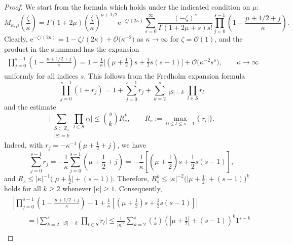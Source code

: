\documentclass[pdftex]{sigma}
\numberwithin{equation}{section}
\newcommand{\ee}{\mathrm{e}}
\begin{document}
\begin{proof}
We start from the formula \cite[equation~(13.14.6)]{DLMF} which holds under the indicated condition on $\mu$:
\begin{equation*}
 M_{\kappa,\mu}\left(\frac{\zeta}{\kappa}\right)=
 \Gamma(1+2\mu)\left(\frac{\zeta}{\kappa}\right)^{\mu+1/2}\ee^{-\zeta/(2\kappa)}\sum_{s=0}^\infty\frac{(-\zeta)^s}{\Gamma(1+2\mu+s)s!}\prod_{j=0}^{s-1}\left(1-\frac{\mu+1/2+j}{\kappa}\right).
\end{equation*}
Clearly, $\ee^{-\zeta/(2\kappa)}=1-\zeta/(2\kappa)+\mathcal{O}\big(\kappa^{-2}\big)$ as $\kappa\to\infty$ for $\zeta=\mathcal{O}(1)$, and the product in the summand has the expansion
\begin{gather}
 \prod_{j=0}^{s-1}\left(1-\frac{\mu+1/2+j}{\kappa}\right) = 1 -\frac{1}{\kappa}\bigg[\left(\mu+\frac{1}{2}\right)s +\frac{1}{2}s(s-1)\bigg] + \mathcal{O}\big(\kappa^{-2}s^s\big),\qquad\kappa\to\infty\!\!\!
\label{eq:uniform-estimate}
\end{gather}
uniformly for all indices $s$.
This follows from the Fredholm expansion formula
\begin{equation*}
 \prod_{j=0}^{s-1}(1+r_j) = 1+\sum_{j=0}^{s-1}r_j + \sum_{k=2}^{s}
 \mathop{\sum_{S\subset \mathbb{Z}_s}}_{|S|=k}\prod_{l\in S}r_l
\end{equation*}
and the estimate
\begin{equation*}
 \Biggl| \sum_{\substack{S\subset \mathbb{Z}_s \\ |S|=k}}\prod_{l\in S}r_l\Biggr|\le \binom{s}{k}R_s^k,\qquad R_s:=\max_{0\le l\le s-1}\{|r_l|\}.
\end{equation*}
Indeed, with $r_j=-\kappa^{-1}(\mu+\frac{1}{2}+j)$, we have
\begin{equation*}
 \sum_{j=0}^{s-1}r_j=-\frac{1}{\kappa}\sum_{j=0}^{s-1}\left(\mu+\frac{1}{2}+j\right) = -\frac{1}{\kappa}\left[\left(\mu+\frac{1}{2}\right)s + \frac{1}{2}s(s-1)\right],
\end{equation*}
and $R_s\le |\kappa|^{-1}\big(\big|\mu+\frac{1}{2}\big| + (s-1)\big)$. Therefore, $R_s^k\le |\kappa|^{-2}\big(\big|\mu+\frac{1}{2}\big|+(s-1)\big)^k$ holds for all $k\ge 2$ whenever $|\kappa|\ge 1$. Consequently,
\begin{gather*}
 \left|\prod_{j=0}^{s-1}\left(1-\frac{\mu+1/2+j}{\kappa}\right)-1+\right. \left.\frac{1}{\kappa}\left[\left(\mu+\frac{1}{2}\right)s+ \frac{1}{2}s(s-1)\right]\right|\\
 \qquad=\Biggl|\sum_{k=2}^s\mathop{\sum_{S\subset\mathbb{Z}_s}}_{|S|=k}\prod_{l\in S}r_l\Biggr|\le \frac{1}{|\kappa|^2}\sum_{k=2}^s\binom{s}{k}\left(\left|\mu+\frac{1}{2}\right|+(s-1)\right)^k1^{s-k}\\

\end{gather*}
\end{proof}
\end{document}
